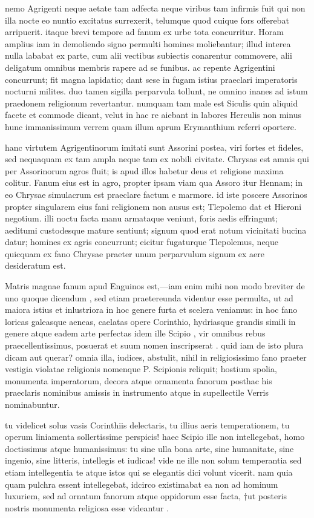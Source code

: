  nemo Agrigenti neque aetate tam adfecta neque viribus tam infirmis fuit qui non illa nocte eo nuntio excitatus surrexerit, telumque quod cuique fors offerebat arripuerit. itaque brevi tempore ad fanum ex urbe tota concurritur. Horam amplius iam in demoliendo signo permulti homines moliebantur; illud interea nulla lababat ex parte, cum alii vectibus subiectis conarentur commovere, alii deligatum omnibus membris rapere ad se funibus. ac repente Agrigentini concurrunt; fit magna lapidatio; dant sese in fugam istius praeclari imperatoris nocturni milites. duo tamen sigilla perparvula tollunt, ne omnino inanes ad istum praedonem religionum revertantur. numquam tam male est Siculis quin aliquid facete et commode dicant, velut in hac re aiebant in labores Herculis non minus hunc immanissimum verrem quam illum aprum Erymanthium referri oportere.

 hanc virtutem Agrigentinorum imitati sunt Assorini postea, viri fortes et fideles, sed nequaquam ex tam ampla neque tam ex nobili civitate. Chrysas est amnis qui per Assorinorum agros fluit; is apud illos habetur deus et religione maxima colitur. Fanum eius est in agro, propter ipsam viam qua Assoro itur Hennam; in eo Chrysae simulacrum est praeclare factum e marmore. id iste poscere Assorinos propter singularem eius fani religionem non ausus est; Tlepolemo dat et Hieroni negotium. illi noctu facta manu armataque veniunt, foris aedis effringunt; aeditumi custodesque mature sentiunt; signum quod erat notum vicinitati bucina datur; homines ex agris concurrunt; eicitur fugaturque Tlepolemus, neque quicquam ex fano Chrysae praeter unum perparvulum signum ex aere desideratum est.

 Matris magnae fanum apud Enguinos est,—iam enim mihi non modo breviter de uno quoque dicendum , sed etiam praetereunda videntur esse permulta, ut ad maiora istius et inlustriora in hoc genere furta et scelera veniamus: in hoc fano loricas galeasque aeneas, caelatas opere Corinthio, hydriasque grandis simili in genere atque eadem arte perfectas idem ille Scipio , vir omnibus rebus praecellentissimus, posuerat et suum nomen inscripserat . quid iam de isto plura dicam aut querar? omnia illa, iudices, abstulit, nihil in religiosissimo fano praeter vestigia violatae religionis nomenque P. Scipionis reliquit; hostium spolia, monumenta imperatorum, decora atque ornamenta fanorum posthac his praeclaris nominibus amissis in instrumento atque in supellectile Verris nominabuntur.

 tu videlicet solus vasis Corinthiis delectaris, tu illius aeris temperationem, tu operum liniamenta sollertissime perspicis! haec Scipio ille non intellegebat, homo doctissimus atque humanissimus: tu sine ulla bona arte, sine humanitate, sine ingenio, sine litteris, intellegis et iudicas! vide ne ille non solum temperantia sed etiam intellegentia te atque istos qui se elegantis dici volunt vicerit. nam quia quam pulchra essent intellegebat, idcirco existimabat ea non ad hominum luxuriem, sed ad ornatum fanorum atque oppidorum esse facta, †ut posteris nostris monumenta religiosa esse videantur .

